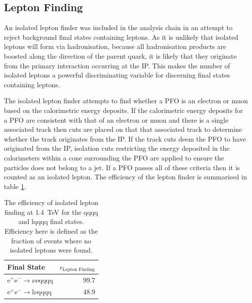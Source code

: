 
\subsection{Lepton Finding} 
\label{sec:isolatedleptonfinding}
An isolated lepton finder was included in the analysis chain in an attempt to reject background final states containing leptons.  As it is unlikely that isolated leptons will form via hadronisation, because all hadronisation products are boosted along the direction of the parent quark, it is likely that they originate from the primary interaction occurring at the IP.  This makes the number of isolated leptons a powerful discriminating variable for discerning final states containing leptons. 

The isolated lepton finder attempts to find whether a PFO is an electron or muon based on the calorimetric energy deposits.  If the calorimetric energy deposits for a PFO are consistent with that of an electron or muon and there is a single associated track then cuts are placed on that that associated track to determine whether the track originates from the IP.  If the track cuts deem the PFO to have originated from the IP, isolation cuts restricting the energy deposited in the calorimeters within a cone surrounding the PFO are applied to ensure the particles does not belong to a jet.  If a PFO passes all of these criteria then it is counted as an isolated lepton.  The efficiency of the lepton finder is summarised in table \ref{table:efficiencyleptonfinding}.   

\begin{table}[h!]
\centering
\begin{tabular}{ l r }
\hline
Final State & $\epsilon_{\text{Lepton Finding}}$ \\ 
\hline
$\text{e}^{+}\text{e}^{-} \rightarrow \nu{\nu}\text{qqqq}$ & 99.7 \\
$\text{e}^{+}\text{e}^{-} \rightarrow \text{l}\nu\text{qqqq}$ & 48.9 \\
\hline
\end{tabular}
\caption[The efficiency of isolated lepton finding at 1.4~TeV for the {\nu}{\nu}qqqq and l{\nu}qqqq final states.]{The efficiency of isolated lepton finding at 1.4~TeV for the {\nu}{\nu}qqqq and l{\nu}qqqq final states.  Efficiency here is defined as the fraction of events where no isolated leptons were found.}
\label{table:efficiencyleptonfinding}
\end{table}

